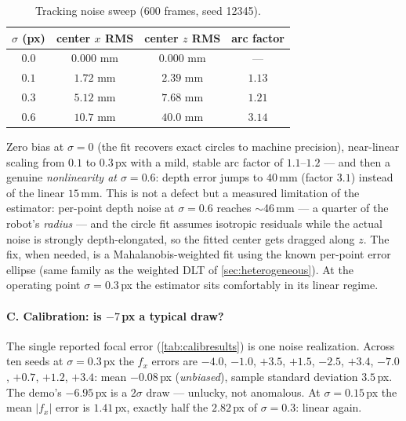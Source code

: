 \documentclass[11pt]{article}
\theoremstyle{definition}
\begin{document}
\begin{table}[ht]
\centering
\begin{tabular}{cccc}
\toprule
$\sigma$ (px) & center $x$ RMS & center $z$ RMS & arc factor \\
\midrule
$0.0$ & $0.000$ mm & $0.000$ mm & --- \\
$0.1$ & $1.72$ mm  & $2.39$ mm  & $1.13$ \\
$0.3$ & $5.12$ mm  & $7.68$ mm  & $1.21$ \\
$0.6$ & $10.7$ mm  & $40.0$ mm  & $3.14$ \\
\bottomrule
\end{tabular}
\caption{Tracking noise sweep (600 frames, seed 12345).}
\label{tab:diagtrack}
\end{table}

Zero bias at $\sigma=0$ (the fit recovers exact circles to machine
precision), near-linear scaling from $0.1$ to $0.3$\,px with a mild,
stable arc factor of $1.1$--$1.2$ --- and then a genuine
\emph{nonlinearity at $\sigma=0.6$}: depth error jumps to $40$\,mm
(factor $3.1$) instead of the linear $15$\,mm. This is not a defect but a
measured limitation of the estimator: per-point depth noise at
$\sigma=0.6$ reaches $\sim$46\,mm --- a quarter of the robot's
\emph{radius} --- and the circle fit assumes isotropic residuals while
the actual noise is strongly depth-elongated, so the fitted center gets
dragged along $z$. The fix, when needed, is a Mahalanobis-weighted fit
using the known per-point error ellipse (same family as the weighted DLT
of \autoref{sec:heterogeneous}). At the operating point
$\sigma=0.3$\,px the estimator sits comfortably in its linear regime.

\paragraph{C. Calibration: is $-7$\,px a typical draw?} The single
reported focal error (\autoref{tab:calibresults}) is one noise
realization. Across ten seeds at $\sigma=0.3$\,px the $f_x$ errors are
$-4.0$, $-1.0$, $+3.5$, $+1.5$, $-2.5$, $+3.4$, $-7.0$, $+0.7$, $+1.2$,
$+3.4$: mean
$-0.08$\,px (\emph{unbiased}), sample standard deviation $3.5$\,px. The
demo's $-6.95$\,px is a $2\sigma$ draw --- unlucky, not anomalous. At
$\sigma=0.15$\,px the mean $|f_x|$ error is $1.41$\,px, exactly half the
$2.82$\,px of $\sigma=0.3$: linear again.
\end{document}
